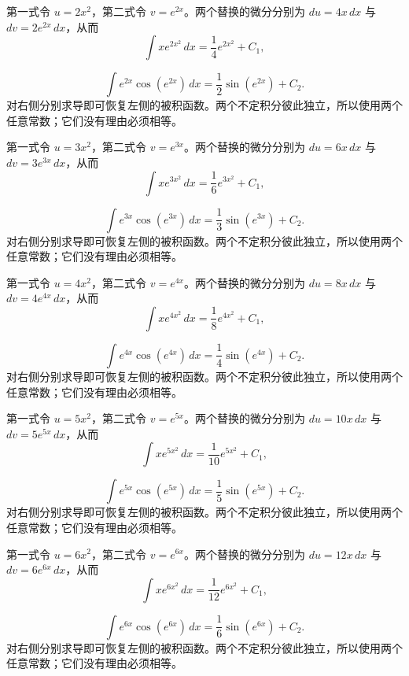 \documentclass[12pt,fontset=fandol]{ctexart}
\begin{document}
\begin{solve}\label{ans:c12q14}
第一式令 $u=2x^2$，第二式令 $v=e^{2x}$。两个替换的微分分别为 $du=4x\,dx$ 与 $dv=2e^{2x}\,dx$，从而
\[
\int xe^{2x^2}\,dx=\frac{1}{4}e^{2x^2}+C_1,
\]

\[
\int e^{2x}\cos(e^{2x})\,dx=\frac{1}{2}\sin(e^{2x})+C_2.
\]
对右侧分别求导即可恢复左侧的被积函数。两个不定积分彼此独立，所以使用两个任意常数；它们没有理由必须相等。
\end{solve}

\begin{solve}\label{ans:c12q15}
第一式令 $u=3x^2$，第二式令 $v=e^{3x}$。两个替换的微分分别为 $du=6x\,dx$ 与 $dv=3e^{3x}\,dx$，从而
\[
\int xe^{3x^2}\,dx=\frac{1}{6}e^{3x^2}+C_1,
\]

\[
\int e^{3x}\cos(e^{3x})\,dx=\frac{1}{3}\sin(e^{3x})+C_2.
\]
对右侧分别求导即可恢复左侧的被积函数。两个不定积分彼此独立，所以使用两个任意常数；它们没有理由必须相等。
\end{solve}

\begin{solve}\label{ans:c12q16}
第一式令 $u=4x^2$，第二式令 $v=e^{4x}$。两个替换的微分分别为 $du=8x\,dx$ 与 $dv=4e^{4x}\,dx$，从而
\[
\int xe^{4x^2}\,dx=\frac{1}{8}e^{4x^2}+C_1,
\]

\[
\int e^{4x}\cos(e^{4x})\,dx=\frac{1}{4}\sin(e^{4x})+C_2.
\]
对右侧分别求导即可恢复左侧的被积函数。两个不定积分彼此独立，所以使用两个任意常数；它们没有理由必须相等。
\end{solve}

\begin{solve}\label{ans:c12q17}
第一式令 $u=5x^2$，第二式令 $v=e^{5x}$。两个替换的微分分别为 $du=10x\,dx$ 与 $dv=5e^{5x}\,dx$，从而
\[
\int xe^{5x^2}\,dx=\frac{1}{10}e^{5x^2}+C_1,
\]

\[
\int e^{5x}\cos(e^{5x})\,dx=\frac{1}{5}\sin(e^{5x})+C_2.
\]
对右侧分别求导即可恢复左侧的被积函数。两个不定积分彼此独立，所以使用两个任意常数；它们没有理由必须相等。
\end{solve}

\begin{solve}\label{ans:c12q18}
第一式令 $u=6x^2$，第二式令 $v=e^{6x}$。两个替换的微分分别为 $du=12x\,dx$ 与 $dv=6e^{6x}\,dx$，从而
\[
\int xe^{6x^2}\,dx=\frac{1}{12}e^{6x^2}+C_1,
\]

\[
\int e^{6x}\cos(e^{6x})\,dx=\frac{1}{6}\sin(e^{6x})+C_2.
\]
对右侧分别求导即可恢复左侧的被积函数。两个不定积分彼此独立，所以使用两个任意常数；它们没有理由必须相等。
\end{solve}
\end{document}
